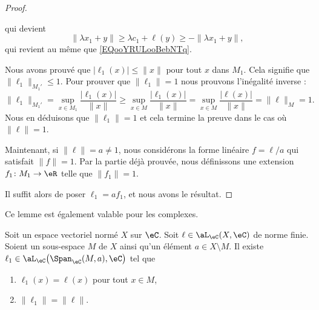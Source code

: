 \begin{proof}
\begin{subproof}
\begin{subproof}
\begin{equation}
			\end{equation}
			qui devient
			\begin{equation}
				\| \lambda x_1+y \|\geq \lambda c_1+\ell(y)\geq -\| \lambda x_1+y \|,
			\end{equation}
			qui revient au même que \eqref{EQooYRULooBebNTq}.
		\end{subproof}
		Nous avons prouvé que \( | \ell_1(x) |\leq \| x \|\) pour tout \( x\) dans \( M_1\). Cela signifie que \( \| \ell_1 \|_{M_1'}\leq 1\). Pour prouver que \( \| \ell_1 \|=1\) nous prouvons l'inégalité inverse :
		\begin{equation}
			\| \ell_1 \|_{M_1'}=\sup_{x\in M_1}\frac{ | \ell_1(x) | }{ \| x \| }\geq\sup_{x\in M}\frac{ | \ell_1(x) | }{ \| x \| }=\sup_{x\in M}\frac{ | \ell(x) | }{ \| x \| }=\| \ell \|_{M}=1.
		\end{equation}
		Nous en déduisons que \( \| \ell_1 \|=1\) et cela termine la preuve dans le cas où \( \|\ell \|=1\).
	\end{subproof}
	Maintenant, si \( \| \ell \|=a\neq 1\), nous considérons la forme linéaire \( f=\ell/a\) qui satisfait \( \| f \|=1\). Par la partie déjà prouvée, nous définissons une extension \( f_1\colon M_1\to \eR\) telle que \( \| f_1 \|=1\).

	Il suffit alors de poser \( \ell_1=af_1\), et nous avons le résultat.
\end{proof}

Ce lemme est également valable pour les complexes.

\begin{lemma}       \label{LEMooBYEGooRswAmh}
	Soit un espace vectoriel normé \( X\) sur \( \eC\). Soit \( \ell\in \aL_{\eC}(X,\eC)\) de norme finie. Soient un sous-espace \( M\) de \( X\) ainsi qu'un élément \( a\in X\setminus M\). Il existe \( \ell_1\in\aL_{\eC}\big( \Span_{\eC}(M, a), \eC \big)\) tel que
	\begin{enumerate}
		\item
		      \( \ell_1(x)=\ell(x)\) pour tout \( x\in M\),
		\item
		      \( \| \ell_1 \|=\| \ell \|\).
	\end{enumerate}
\end{lemma}

